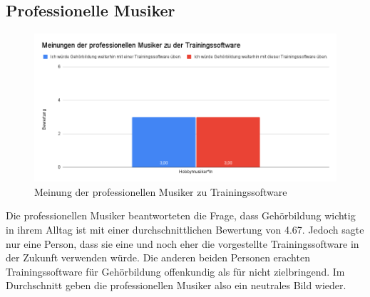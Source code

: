 \subsection*{Professionelle Musiker}
\begin{figure}[H]
    \centering
    \includegraphics[width=1\textwidth]{Bilder/eval-profis.png}
    \caption{Meinung der professionellen Musiker zu Trainingssoftware}
\end{figure}
Die professionellen Musiker beantworteten die Frage, dass Gehörbildung wichtig in ihrem Alltag ist mit einer durchschnittlichen Bewertung von 4.67. Jedoch sagte nur eine Person, dass sie eine und noch eher die vorgestellte Trainingssoftware in der Zukunft verwenden würde. Die anderen beiden Personen erachten Trainingssoftware für Gehörbildung offenkundig als für nicht zielbringend. Im Durchschnitt geben die professionellen Musiker also ein neutrales Bild wieder.

